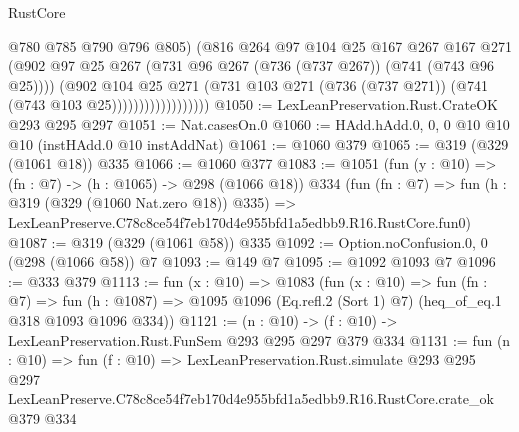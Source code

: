 \begin{lexlean}{RustCore}
\begin{coremodule}
                                @780
                                @785
                                @790
                                @796
                                @805)
                              (@816
                                @264
                                @97
                                @104
                                @25
                                @167
                                @267
                                @167
                                @271
                                (@902
                                  @97
                                  @25
                                  @267
                                  (@731 @96 @267 (@736 (@737 @267)) (@741 (@743 @96 @25))))
                                (@902
                                  @104
                                  @25
                                  @271
                                  (@731
                                    @103
                                    @271
                                    (@736 (@737 @271))
                                    (@741 (@743 @103 @25))))))))))))))))))
@1050 := LexLeanPreservation.Rust.CrateOK @293 @295 @297
@1051 := Nat.casesOn.{0}
@1060 := HAdd.hAdd.{0, 0, 0} @10 @10 @10 (instHAdd.{0} @10 instAddNat)
@1061 := @1060 @379
@1065 := @319 (@329 (@1061 @18)) @335
@1066 := @1060 @377
@1083 := @1051
    (fun (y : @10) => (fn : @7) -> (h : @1065) -> @298 (@1066 @18))
    @334
    (fun (fn : @7) =>
    fun (h : @319 (@329 (@1060 Nat.zero @18)) @335) =>
    LexLeanPreserve.C78c8ce54f7eb170d4e955bfd1a5edbb9.R16.RustCore.fun0)
@1087 := @319 (@329 (@1061 @58)) @335
@1092 := Option.noConfusion.{0, 0} (@298 (@1066 @58)) @7
@1093 := @149 @7
@1095 := @1092 @1093 @7
@1096 := @333 @379
@1113 := fun (x : @10) =>
  @1083
    (fun (x : @10) =>
    fun (fn : @7) =>
    fun (h : @1087) => @1095 @1096 (Eq.refl.{2} (Sort 1) @7) (heq_of_eq.{1} @318 @1093 @1096 @334))
@1121 := (n : @10) -> (f : @10) -> LexLeanPreservation.Rust.FunSem @293 @295 @297 @379 @334
@1131 := fun (n : @10) =>
  fun (f : @10) =>
  LexLeanPreservation.Rust.simulate
    @293
    @295
    @297
    LexLeanPreserve.C78c8ce54f7eb170d4e955bfd1a5edbb9.R16.RustCore.crate_ok
    @379
    @334
\end{coremodule}
\end{lexlean}
